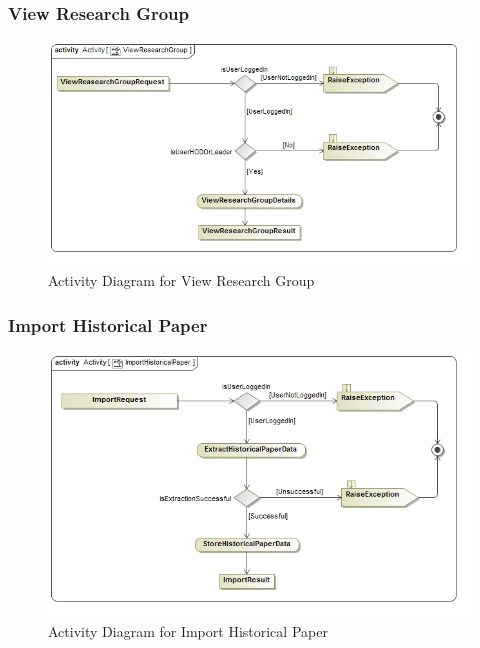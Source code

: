 \documentclass[a4paper,10pt]{article}
\begin{document}
\subsubsection{View Research Group}
	\begin{figure}[H]
		\includegraphics[scale=0.5]{ActViewResearchGroup}
		\caption{Activity Diagram for View Research Group}
	\end{figure}
	
\subsubsection{Import Historical Paper}
	\begin{figure}[H]
		\includegraphics[scale=0.5]{ActImportHistoricalPaper}
		\caption{Activity Diagram for Import Historical Paper}
	\end{figure}
\end{document}
